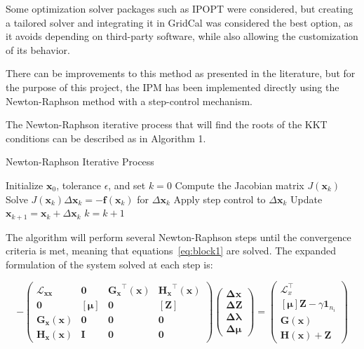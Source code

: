 Some optimization solver packages such as IPOPT were considered, but creating a tailored solver and integrating it in GridCal was considered the best option, as it 
avoids depending on third-party software, while also allowing the customization of its behavior.

There can be improvements to this method as presented in the literature, %
but for the purpose of this project, the IPM has been implemented directly using the Newton-Raphson method with a step-control mechanism. 

The Newton-Raphson iterative process that will find the roots of the KKT conditions can be described as in Algorithm 1.

\begin{algorithm}
\caption{Newton-Raphson Iterative Process}
\begin{algorithmic}[1]
\STATE Initialize $\bm{x}_0$, tolerance $\epsilon$, and set $k = 0$
    \STATE Compute the Jacobian matrix $J(\bm{x}_k)$
    \STATE Solve $J(\bm{x}_k) \Delta \bm{x}_k = -\bm{f}(\bm{x}_k)$ for $\Delta \bm{x}_k$
    \STATE Apply step control to $\Delta \bm{x}_k$
    \STATE Update $\bm{x}_{k+1} = \bm{x}_k + \Delta \bm{x}_k$
    \STATE $k = k + 1$
\ENDWHILE
\end{algorithmic}
\end{algorithm}

The algorithm will perform several Newton-Raphson steps until the convergence criteria is met, meaning that equations~\eqref{eq:block1} are solved. 
The expanded formulation of the system solved at each step is:

\begin{equation}
    - \begin{pmatrix}
        \bm{\mathcal{L}_{xx}} & \bm{0} & \bm{G_x}^\top(\bm{x}) & \bm{H_x}^\top(\bm{x}) \\ 
        \bm{0} & [\bm{\mu}] & \bm{0} & [\bm{Z}] \\
        \bm{G_x}(\bm{x}) & \bm{0} & \bm{0} & \bm{0} \\
        \bm{H_x}(\bm{x}) & \bm{I} & \bm{0} & \bm{0}
    \end{pmatrix}
    \begin{pmatrix}
        \bm{\Delta x} \\
        \bm{\Delta Z} \\
        \bm{\Delta \lambda} \\
        \bm{\Delta \mu}
    \end{pmatrix} = 
    \begin{pmatrix}
        \mathcal{L}_x^\top \\
[\bm{\mu}] \bm{Z} - \gamma \bm{1}_{n_i} \\
\bm{G}(\bm{x}) \\
\bm{H}(\bm{x}) + \bm{Z}
    \end{pmatrix}
    \label{eq:Jacob_full}
\end{equation}

